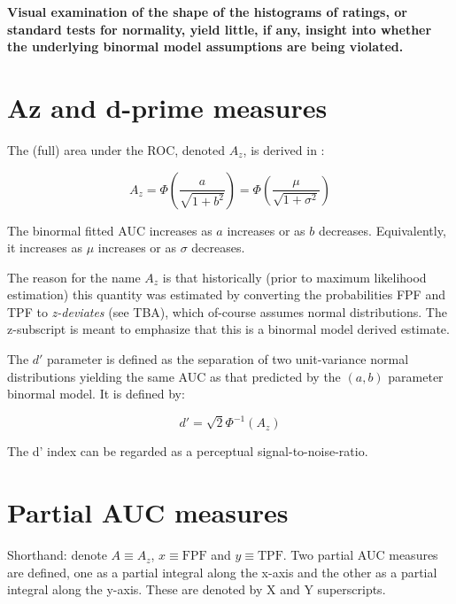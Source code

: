 \documentclass[
]{book}
\begin{document}
\textbf{Visual examination of the shape of the histograms of ratings, or standard tests for normality, yield little, if any, insight into whether the underlying binormal model assumptions are being violated.}

\hypertarget{binormal-model-full-auc}{%
\section{Az and d-prime measures}\label{binormal-model-full-auc}}

The (full) area under the ROC, denoted \(A_z\), is derived in \citep{thompson1989statistical}:

\begin{equation} 
A_z=\Phi\left ( \frac{a}{\sqrt{1+b^2}} \right )=\Phi\left ( \frac{\mu}{\sqrt{1+\sigma^2}} \right )
\label{eq:binormal-model-ab-2az}
\end{equation}

The binormal fitted AUC increases as \(a\) increases or as \(b\) decreases. Equivalently, it increases as \(\mu\) increases or as \(\sigma\) decreases.

The reason for the name \(A_z\) is that historically (prior to maximum likelihood estimation) this quantity was estimated by converting the probabilities FPF and TPF to \emph{z-deviates} (see TBA), which of-course assumes normal distributions. The z-subscript is meant to emphasize that this is a binormal model derived estimate.

The \(d'\) parameter is defined as the separation of two unit-variance normal distributions yielding the same AUC as that predicted by the \((a,b)\) parameter binormal model. It is defined by:

\begin{equation} 
d'=\sqrt{2}\Phi^{-1}\left ( A_z \right )
\label{eq:binormal-model-ab-2dprime}
\end{equation}

The d' index can be regarded as a perceptual signal-to-noise-ratio.

\hypertarget{binormal-model-partial-auc}{%
\section{Partial AUC measures}\label{binormal-model-partial-auc}}

Shorthand: denote \(A \equiv A_z\), \(x \equiv \text{FPF}\) and \(y \equiv \text{TPF}\). Two partial AUC measures are defined, one as a partial integral along the x-axis and the other as a partial integral along the y-axis. These are denoted by X and Y superscripts.
\end{document}
